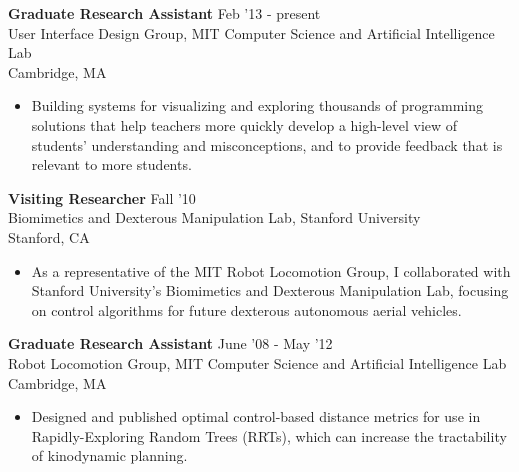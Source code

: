 \documentclass[margin]{res}
\begin{document}
\begin{resume}
 {\bf Graduate Research Assistant} \hfill Feb '13 - present \\ User Interface Design Group, MIT Computer Science and Artificial Intelligence Lab \\ Cambridge, MA 
 \begin{itemize} \itemsep -2pt  %
 \item Building systems for visualizing and exploring thousands of programming solutions that help teachers more quickly develop a high-level view of students' understanding and misconceptions, and to provide feedback that is relevant to more students.
 \end{itemize}

 {\bf Visiting Researcher} \hfill Fall '10 \\Biomimetics and Dexterous Manipulation Lab, Stanford University  \\ Stanford, CA 
 \begin{itemize} \itemsep -2pt  %
\item As a representative of the MIT Robot Locomotion Group, I collaborated with Stanford University's Biomimetics and Dexterous Manipulation Lab, focusing on control algorithms for future dexterous autonomous aerial vehicles.
 \end{itemize}

 {\bf Graduate Research Assistant} \hfill June '08 - May '12 \\ Robot Locomotion Group, MIT Computer Science and Artificial Intelligence Lab \\ Cambridge, MA 
 \begin{itemize} \itemsep -2pt  %
 \item Designed and published optimal control-based distance metrics for use in Rapidly-Exploring Random Trees (RRTs), which can increase the tractability of kinodynamic planning.
 \end{itemize}
 

\end{resume}
\end{document}
